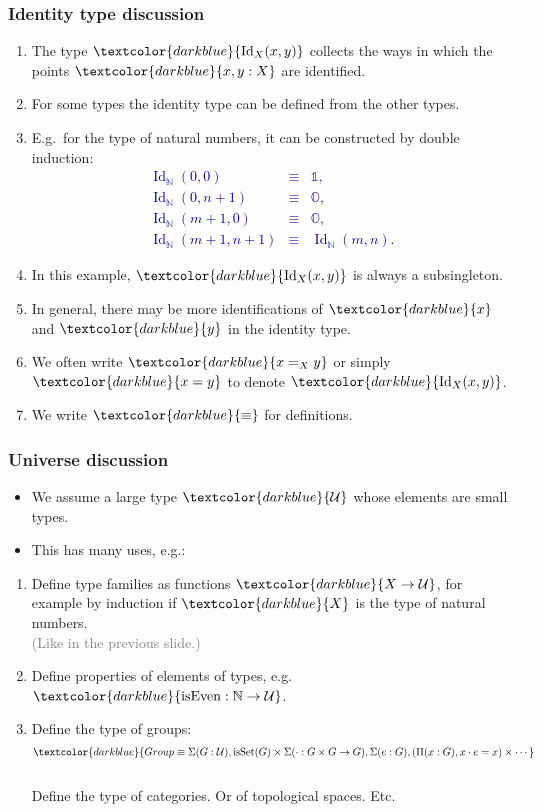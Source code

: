 \documentclass[aspectratio=169]{beamer}
\newcommand{\isSet}{\operatorname{isSet}}
\newcommand{\eqq}{\equiv}
\newcommand{\U}{\operatorname{\mathcal{U}}}
\newcommand{\db}{\textcolor{darkblue}}
\newcommand{\grey}{\textcolor{grey}}
\newcommand{\m}[1]{$\db{#1}$}
\newcommand{\M}[1]{\[\db{#1}\]}
\newcommand{\N}{\mathbb{N}}
\newcommand{\Id}{\operatorname{Id}}
\begin{document}
\begin{frame}
  \frametitle{Identity type discussion}

  \begin{enumerate}
\vfill \item The type \m{\Id_X(x,y)} collects the ways in which the points \m{x,y:X} are identified.
  \vfill \item For some types the identity type can be defined from the other types. 
  \vfill \item E.g.\ for the type of natural numbers, it can be constructed by double induction:
  \db{\begin{eqnarray*}
    \Id_\N(0,0) & \eqq & \mathbb{1}, \\
    \Id_\N(0,n+1) & \eqq & \mathbb{O}, \\
    \Id_\N(m+1,0) & \eqq & \mathbb{O}, \\
    \Id_\N(m+1,n+1) & \eqq & \Id_\N(m,n).
  \end{eqnarray*}}

  \vspace*{-4ex}

  \vfill \item In this example, \m{\Id_X(x,y)} is always a subsingleton.
  \vfill \item In general, there may be more identifications of \m{x} and \m{y} in the identity type.
  \vfill \item We often write \m{x =_X y} or simply \m{x = y} to denote \m{\Id_X(x,y)}.
  \vfill \item We write \m{\eqq} for definitions.
  \end{enumerate}

\end{frame}


\begin{frame}
  \frametitle{Universe discussion}

  \begin{itemize}
  \vfill \item We assume a large type \m{\U} whose elements are small types.
\vfill \item This has many uses, e.g.:
  \end{itemize}
\begin{enumerate}
\vfill \item Define type families as functions \m{X \to \U}, for example by induction if \m{X} is the type of natural numbers. \\[1ex]
\grey{(Like in the previous slide.)}
\vfill \item Define properties of elements of types, e.g. \m{\operatorname{isEven} : \N \to \U}.
\vfill \item Define the type of groups:
\M{Group \eqq \Sigma(G:\U), \isSet(G) \times \Sigma(\cdot : G \times G \to G), \Sigma(e:G), (\Pi(x:G), x \cdot e = x) \times \cdots} \\[1ex]
Define the type of categories. Or of topological spaces.
Etc.
\end{enumerate}

\end{frame}
\end{document}
